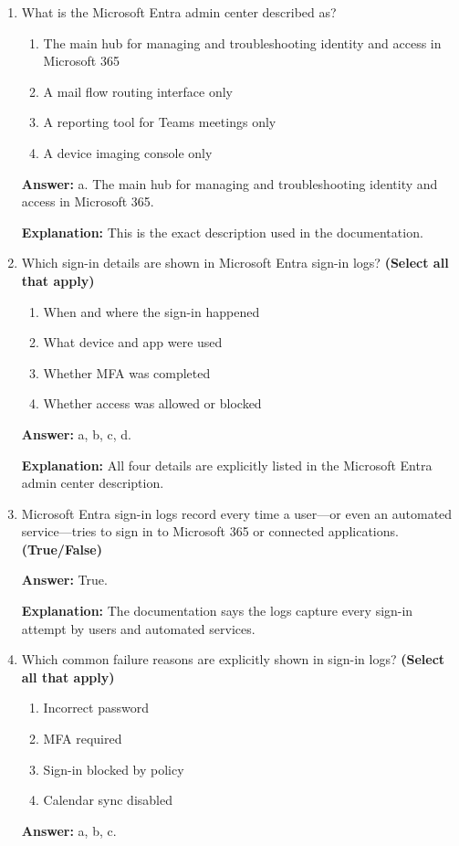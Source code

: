 \documentclass[10pt]{article}
\begin{document}
\begin{enumerate}[leftmargin=*]
\item What is the Microsoft Entra admin center described as?
\begin{enumerate}[label=\alph*., leftmargin=1.5em]
\item The main hub for managing and troubleshooting identity and access in Microsoft 365
\item A mail flow routing interface only
\item A reporting tool for Teams meetings only
\item A device imaging console only
\end{enumerate}
\textbf{Answer:} a. The main hub for managing and troubleshooting identity and access in Microsoft 365.

\textbf{Explanation:} This is the exact description used in the documentation.

\item Which sign-in details are shown in Microsoft Entra sign-in logs? \textbf{(Select all that apply)}
\begin{enumerate}[label=\alph*., leftmargin=1.5em]
\item When and where the sign-in happened
\item What device and app were used
\item Whether MFA was completed
\item Whether access was allowed or blocked
\end{enumerate}
\textbf{Answer:} a, b, c, d.

\textbf{Explanation:} All four details are explicitly listed in the Microsoft Entra admin center description.

\item Microsoft Entra sign-in logs record every time a user—or even an automated service—tries to sign in to Microsoft 365 or connected applications. \textbf{(True/False)}

\textbf{Answer:} True.

\textbf{Explanation:} The documentation says the logs capture every sign-in attempt by users and automated services.

\item Which common failure reasons are explicitly shown in sign-in logs? \textbf{(Select all that apply)}
\begin{enumerate}[label=\alph*., leftmargin=1.5em]
\item Incorrect password
\item MFA required
\item Sign-in blocked by policy
\item Calendar sync disabled
\end{enumerate}
\textbf{Answer:} a, b, c.


\end{enumerate}
\end{document}
